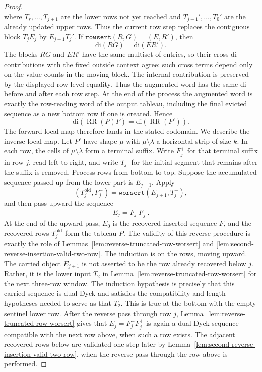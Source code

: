 \documentclass[11pt]{article}
\theoremstyle{plain}
\theoremstyle{definition}
\theoremstyle{remark}
\newcommand{\di}{\mathrm{di}}
\newcommand{\rowsert}{\texttt{rowsert}}
\newcommand{\worsert}{\texttt{worsert}}
\begin{document}
\begin{proof}
\[\]
where \(T_r,\ldots,T_{j+1}\) are the lower rows not yet reached and
\(T_{j-1}',\ldots,T_0'\) are the already updated upper rows.  Thus the current
row step replaces the contiguous block \(T_jE_j\) by \(E_{j+1}T_j'\).  If
\(\rowsert(R,G)=(E,R')\), then
\[
  \di(RG)=\di(ER').
\]
The blocks \(RG\) and \(ER'\) have the same multiset of entries, so their
cross-\(\di\) contributions with the fixed outside context agree: such cross
terms depend only on the value counts in the moving block.  The internal
contribution is preserved by the displayed row-level equality.  Thus the
augmented word has the same \(\di\) before and after each row step.  At the end
of the process the augmented word is exactly the row-reading word of the output
tableau, including the final evicted sequence as a new bottom row if one is
created.  Hence
\[
  \di(\operatorname{RR}(P)F)=\di(\operatorname{RR}(P')).
\]
The forward local map therefore lands in the stated codomain.
We describe the inverse local map.  Let \(P'\) have shape \(\mu\) with
\(\mu\setminus\lambda\) a horizontal strip of size \(k\).  In each row, the
cells of \(\mu\setminus\lambda\) form a terminal suffix.  Write \(F_j^+\) for
that terminal suffix in row \(j\), read left-to-right, and write \(T_j^-\) for
the initial segment that remains after the suffix is removed.
Process rows from bottom to top.  Suppose the accumulated sequence passed up
from the lower part is \(E_{j+1}\).  Apply
\[
  (T_j^{\mathrm{old}},F_j^-)=\worsert(E_{j+1},T_j^-),
\]
and then pass upward the sequence
\[
  E_j=F_j^-F_j^+.
\]
At the end of the upward pass, \(E_0\) is the recovered inserted sequence
\(F\), and the recovered rows \(T_j^{\mathrm{old}}\) form the tableau \(P\).
The validity of this reverse procedure is exactly the role of
Lemmas~\ref{lem:reverse-truncated-row-worsert} and
\ref{lem:second-reverse-insertion-valid-two-row}.  The induction is on the
rows, moving upward.  The carried object \(E_{j+1}\) is not asserted to be the
row already recovered below \(j\).  Rather, it is the lower input \(T_2\) in
Lemma~\ref{lem:reverse-truncated-row-worsert} for the next three-row window.
The induction hypothesis is precisely that this carried sequence is dual Dyck
and satisfies the compatibility and length hypotheses needed to serve as that
\(T_2\).  This is true at the bottom with the empty sentinel lower row.
After the reverse pass through row \(j\), Lemma~\ref{lem:reverse-truncated-row-worsert}
gives that \(E_j=F_j^-F_j^+\) is again a dual Dyck sequence compatible with
the next row above, when such a row exists.  The adjacent recovered rows below
are validated one step later by Lemma~\ref{lem:second-reverse-insertion-valid-two-row},
when the reverse pass through the row above is performed.


\end{proof}
\end{document}
